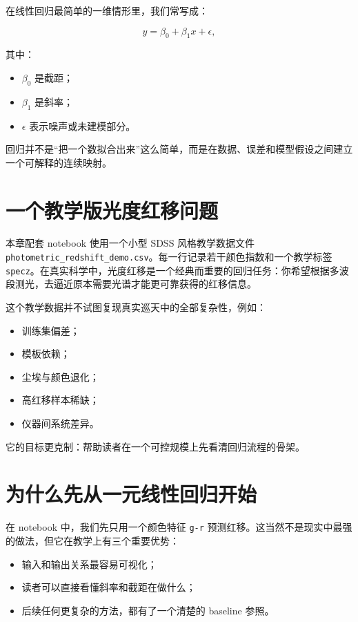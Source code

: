 在线性回归最简单的一维情形里，我们常写成：

\[
y = \beta_0 + \beta_1 x + \epsilon,
\]

其中：

\begin{itemize}
    \item $\beta_0$ 是截距；
    \item $\beta_1$ 是斜率；
    \item $\epsilon$ 表示噪声或未建模部分。
\end{itemize}

\begin{defbox}[回归任务的核心]
回归并不是“把一个数拟合出来”这么简单，而是在数据、误差和模型假设之间建立一个可解释的连续映射。
\end{defbox}

\section{一个教学版光度红移问题}

本章配套 notebook 使用一个小型 SDSS 风格教学数据文件 \nolinkurl{photometric_redshift_demo.csv}。每一行记录若干颜色指数和一个教学标签 \texttt{specz}。在真实科学中，光度红移是一个经典而重要的回归任务：你希望根据多波段测光，去逼近原本需要光谱才能更可靠获得的红移信息。

这个教学数据并不试图复现真实巡天中的全部复杂性，例如：

\begin{itemize}
    \item 训练集偏差；
    \item 模板依赖；
    \item 尘埃与颜色退化；
    \item 高红移样本稀缺；
    \item 仪器间系统差异。
\end{itemize}

它的目标更克制：帮助读者在一个可控规模上先看清回归流程的骨架。

\section{为什么先从一元线性回归开始}

在 notebook 中，我们先只用一个颜色特征 \texttt{g-r} 预测红移。这当然不是现实中最强的做法，但它在教学上有三个重要优势：

\begin{itemize}
    \item 输入和输出关系最容易可视化；
    \item 读者可以直接看懂斜率和截距在做什么；
    \item 后续任何更复杂的方法，都有了一个清楚的 baseline 参照。
\end{itemize}

